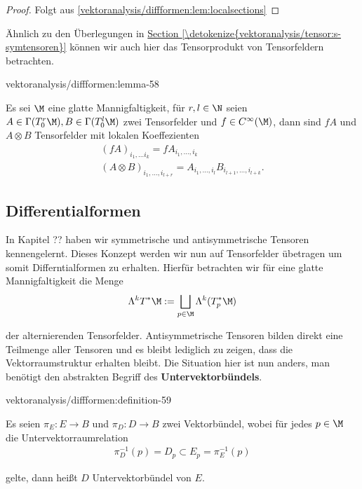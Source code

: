 \documentclass[letterpaper,10pt,english]{jupyterBook}
\begin{document}
\begin{proof}
 Folgt aus \cref{vektoranalysis/diffformen:lem:localsections} 
\end{proof}

\par
Ähnlich zu den Überlegungen in \hyperref[\detokenize{vektoranalysis/tensor:s-symtensoren}]{Section \ref{\detokenize{vektoranalysis/tensor:s-symtensoren}}} können wir auch hier das Tensorprodukt von Tensorfeldern betrachten.
\begin{lemma}{}{vektoranalysis/diffformen:lemma-58}



\par
Es sei \(\M\) eine glatte Mannigfaltigkeit, für \(r,l\in \N\) seien \(A\in \Gamma(T^r_0\M), B\in \Gamma(T^l_0\M)\) zwei Tensorfelder und \(f\in C^\infty(\M)\), dann sind \(fA\) und \(A\otimes B\) Tensorfelder mit lokalen Koeffezienten
\begin{align*}
(fA)_{i_1,\ldots i_{k}} = f A_{i_1,\ldots, i_k}\\
(A\otimes B)_{i_1,\ldots,i_{l+r}} = A_{i_1,\ldots, i_l} B_{i_{l+1},\ldots, i_{l+k}}.
\end{align*}\end{lemma}


\subsection{Differentialformen}
\label{\detokenize{vektoranalysis/diffformen:differentialformen}}
\par
In Kapitel ?? haben wir symmetrische und antisymmetrische Tensoren kennengelernt. Dieses Konzept werden wir nun auf Tensorfelder übetragen um somit Differntialformen zu erhalten. Hierfür betrachten wir für eine glatte Mannigfaltigkeit die Menge
\begin{align*}
\Lambda^k T^\ast\M := \bigsqcup_{p\in\M} \Lambda^k (T^\ast_p\M)
\end{align*}
\par
der alternierenden Tensorfelder. Antisymmetrische Tensoren bilden direkt eine Teilmenge aller Tensoren und es bleibt lediglich zu zeigen, dass die Vektorraumstruktur erhalten bleibt. Die Situation hier ist nun anders, man benötigt den abstrakten Begriff des \textbf{Untervektorbündels}.
\begin{definition}{}{vektoranalysis/diffformen:definition-59}



\par
Es seien \(\pi_E:E\to B\) und \(\pi_D:D\to B\) zwei Vektorbündel, wobei für jedes \(p\in\M\) die Untervektorraumrelation
\begin{align*}
\pi_D^{-1}(p) = D_p\subset E_p = \pi_E^{-1}(p)
\end{align*}
\par
gelte, dann heißt \(D\) Untervektorbündel von \(E\).
\end{definition}
\end{document}
